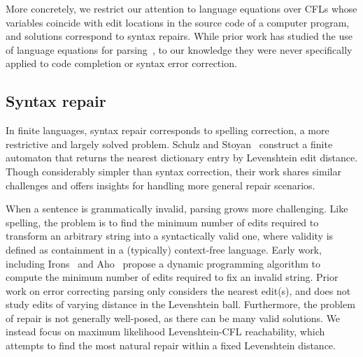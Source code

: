\documentclass[sigplan,acmsmall,nonacm,screen]{acmart}\settopmatter{printfolios=false,printccs=false,printacmref=false}
\begin{document}
  More concretely, we restrict our attention to language equations over CFLs whose variables coincide with edit locations in the source code of a computer program, and solutions correspond to syntax repairs. While prior work has studied the use of language equations for parsing~\cite{might2011parsing}, to our knowledge they were never specifically applied to code completion or syntax error correction.

  \subsection{Syntax repair}

  In finite languages, syntax repair corresponds to spelling correction, a more restrictive and largely solved problem. Schulz and Stoyan~\cite{schulz2002fast} construct a finite automaton that returns the nearest dictionary entry by Levenshtein edit distance. Though considerably simpler than syntax correction, their work shares similar challenges and offers insights for handling more general repair scenarios.

  When a sentence is grammatically invalid, parsing grows more challenging. Like spelling, the problem is to find the minimum number of edits required to transform an arbitrary string into a syntactically valid one, where validity is defined as containment in a (typically) context-free language. Early work, including Irons~\cite{irons1963error} and Aho~\cite{aho1972minimum} propose a dynamic programming algorithm to compute the minimum number of edits required to fix an invalid string. Prior work on error correcting parsing only considers the nearest edit(s), and does not study edits of varying distance in the Levenshtein ball. Furthermore, the problem of repair is not generally well-posed, as there can be many valid solutions. We instead focus on maximum likelihood Levenshtein-CFL reachability, which attempts to find the most natural repair within a fixed Levenshtein distance.


\end{document}
